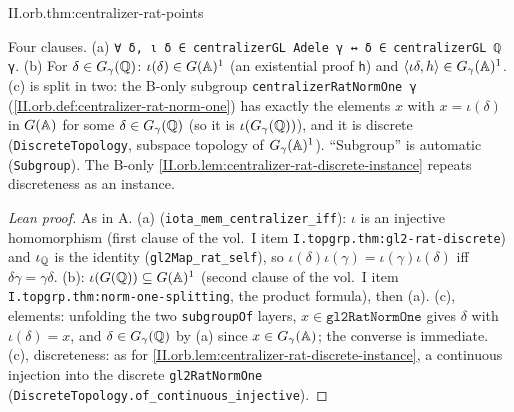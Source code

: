 \begin{theorem}
\end{theorem}
\begin{tfformal}{II.orb.thm:centralizer-rat-points}
\begin{tffidelity}
Four clauses. (a) \texttt{∀ δ, ι δ ∈ centralizerGL Adele γ ↔ δ ∈ centralizerGL ℚ γ}. (b) For $\delta\in G_\gamma(\mathbb{Q})$: $\iota(\delta)\in G(\mathbb{A})^1$ (an existential proof \texttt{h}) and $\langle\iota\delta,h\rangle\in G_\gamma(\mathbb{A})^1$. (c) is split in two: the B-only subgroup \texttt{centralizerRatNormOne γ} (\cref{II.orb.def:centralizer-rat-norm-one}) has exactly the elements $x$ with $x=\iota(\delta)$ in $G(\mathbb{A})$ for some $\delta\in G_\gamma(\mathbb{Q})$ (so it is $\iota(G_\gamma(\mathbb{Q}))$), and it is discrete (\texttt{DiscreteTopology}, subspace topology of $G_\gamma(\mathbb{A})^1$). ``Subgroup'' is automatic (\texttt{Subgroup}). The B-only \cref{II.orb.lem:centralizer-rat-discrete-instance} repeats discreteness as an instance.
\end{tffidelity}
\end{tfformal}
\begin{proof}[Lean proof]
As in A. (a) (\texttt{iota\_mem\_centralizer\_iff}): $\iota$ is an injective homomorphism (first clause of the vol.~I item \texttt{I.topgrp.thm:gl2-rat-discrete}) and $\iota_{\mathbb{Q}}$ is the identity (\texttt{gl2Map\_rat\_self}), so $\iota(\delta)\iota(\gamma)=\iota(\gamma)\iota(\delta)$ iff $\delta\gamma=\gamma\delta$. (b): $\iota(G(\mathbb{Q}))\subseteq G(\mathbb{A})^1$ (second clause of the vol.~I item \texttt{I.topgrp.thm:norm-one-splitting}, the product formula), then (a). (c), elements: unfolding the two \texttt{subgroupOf} layers, $x\in\texttt{gl2RatNormOne}$ gives $\delta$ with $\iota(\delta)=x$, and $\delta\in G_\gamma(\mathbb{Q})$ by (a) since $x\in G_\gamma(\mathbb{A})$; the converse is immediate. (c), discreteness: as for \cref{II.orb.lem:centralizer-rat-discrete-instance}, a continuous injection into the discrete \texttt{gl2RatNormOne} (\texttt{DiscreteTopology.of\_continuous\_injective}).
\end{proof}

